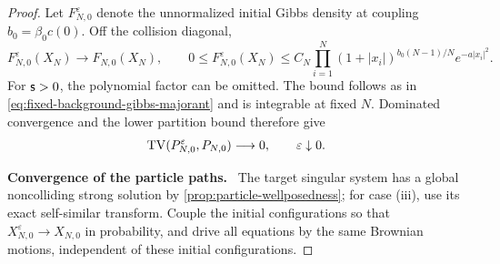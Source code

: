 \documentclass[11pt,reqno]{amsart}
\numberwithin{equation}{section}
\theoremstyle{plain}
\theoremstyle{remark}
\newcommand{\parheading}[1]{\par\medskip\noindent\textbf{#1}\ }
\begin{document}
\begin{proof}
Let $F_{N,0}^\varepsilon$ denote the unnormalized initial Gibbs density at coupling $b_0=\beta_0c(0)$. Off the collision diagonal,
\begin{equation}\label{eq:approximation-initial-Gibbs-domination}
 F_{N,0}^\varepsilon(X_N)\longrightarrow F_{N,0}(X_N),
 \qquad
 0\le F_{N,0}^\varepsilon(X_N)
 \le C_N\prod_{i=1}^N(1+|x_i|)^{b_0(N-1)/N}e^{-a|x_i|^2}.
\end{equation}
For $\mathsf{s}>0$, the polynomial factor can be omitted. The bound follows as in \eqref{eq:fixed-background-gibbs-majorant} and is integrable at fixed $N$. Dominated convergence and the lower partition bound therefore give
\begin{equation}\label{eq:approximation-initial-TV}
 \operatorname{TV}(P_{N,0}^\varepsilon,P_{N,0})\longrightarrow0,
 \qquad \varepsilon\downarrow0.
\end{equation}

\parheading{Convergence of the particle paths.}
The target singular system has a global noncolliding strong solution by \cref{prop:particle-wellposedness}; for case (iii), use its exact self-similar transform. Couple the initial configurations so that $X_{N,0}^\varepsilon\to X_{N,0}$ in probability, and drive all equations by the same Brownian motions, independent of these initial configurations.


\end{proof}
\end{document}
